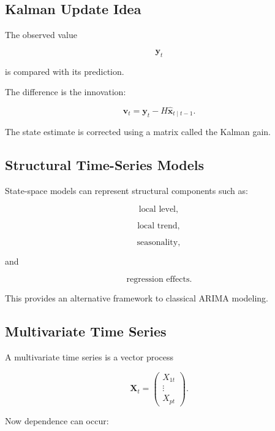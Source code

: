 \subsection{Kalman Update Idea}
\label{subsec:kalman-update}

The observed value

\[
\mathbf{y}_t
\]

is compared with its prediction.

The difference is the innovation:

\[
\boxed{
\mathbf{v}_t
=
\mathbf{y}_t
-
H
\widehat{\mathbf{x}}_{t\mid t-1}.
}
\]

The state estimate is corrected using a matrix called the Kalman gain.

\subsection{Structural Time-Series Models}
\label{subsec:structural-time-series}

State-space models can represent structural components such as:

\[
\boxed{
\text{local level},
}
\]

\[
\boxed{
\text{local trend},
}
\]

\[
\boxed{
\text{seasonality},
}
\]

and

\[
\boxed{
\text{regression effects}.
}
\]

This provides an alternative framework to classical ARIMA modeling.

\subsection{Multivariate Time Series}
\label{subsec:multivariate-time-series}

A multivariate time series is a vector process

\[
\boxed{
\mathbf{X}_t
=
\begin{pmatrix}
X_{1t}\\
\vdots\\
X_{pt}
\end{pmatrix}.
}
\]

Now dependence can occur:

